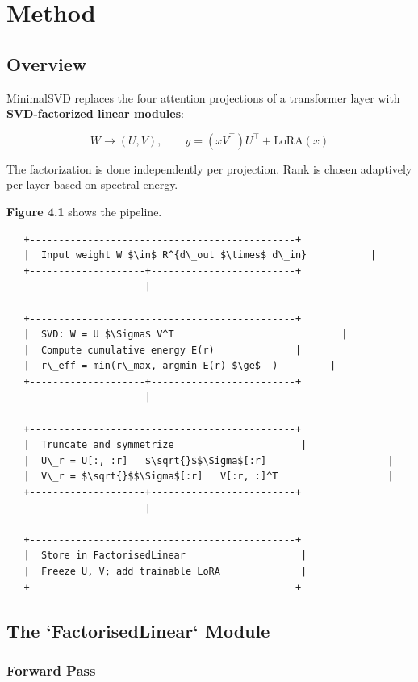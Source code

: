 
\section{Method}

\subsection{Overview}

MinimalSVD replaces the four attention projections of a transformer layer 
with \textbf{SVD-factorized linear modules}:

\[
W \to (U, V), \qquad
y = (x V^\top) U^\top + \text{LoRA}(x)
\tag{4.1}
\]

The factorization is done independently per projection. Rank is chosen 
adaptively per layer based on spectral energy.

\textbf{Figure 4.1} shows the pipeline.

\begin{lstlisting}
   +----------------------------------------------+
   |  Input weight W $\in$ R^{d\_out $\times$ d\_in}           |
   +--------------------+-------------------------+
                        |
                         
   +----------------------------------------------+
   |  SVD: W = U $\Sigma$ V^T                             |
   |  Compute cumulative energy E(r)              |
   |  r\_eff = min(r\_max, argmin E(r) $\ge$  )         |
   +--------------------+-------------------------+
                        |
                         
   +----------------------------------------------+
   |  Truncate and symmetrize                      |
   |  U\_r = U[:, :r]   $\sqrt{}$$\Sigma$[:r]                     |
   |  V\_r = $\sqrt{}$$\Sigma$[:r]   V[:r, :]^T                   |
   +--------------------+-------------------------+
                        |
                         
   +----------------------------------------------+
   |  Store in FactorisedLinear                    |
   |  Freeze U, V; add trainable LoRA              |
   +----------------------------------------------+
\end{lstlisting}

\subsection{The `FactorisedLinear` Module}

\subsubsection{Forward Pass}

